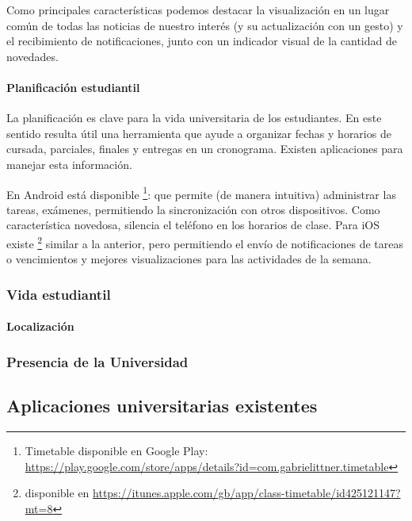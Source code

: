 Como principales características podemos destacar la visualización en un lugar común de todas las noticias de nuestro interés (y su actualización con un gesto) y el recibimiento de notificaciones, junto con un indicador visual de la cantidad de novedades.

\paragraph{Planificación estudiantil}

La planificación es clave para la vida universitaria de los estudiantes. En este sentido resulta útil una herramienta que ayude a organizar fechas y horarios
de cursada, parciales, finales y entregas en un cronograma. Existen 
aplicaciones para manejar esta información.

En Android está disponible 
\footnote{Timetable disponible en Google Play: 
\url{https://play.google.com/store/apps/details?id=com.gabrielittner.timetable} }:
que permite (de manera intuitiva) administrar las tareas, exámenes, permitiendo la sincronización con otros dispositivos. Como característica novedosa, silencia el teléfono en los horarios
de clase.
Para iOS existe 
\footnote{ disponible en
\url{https://itunes.apple.com/gb/app/class-timetable/id425121147?mt=8} } similar
a la anterior, pero permitiendo el envío de notificaciones de tareas o
vencimientos y mejores visualizaciones para las actividades de la semana.

\subsubsection{Vida estudiantil}
\label{aplicaciones_utiles_existentes_vida}

\paragraph{Localización}
\label{aplicaciones_utiles_existentes_localizacion}

\subsubsection{Presencia de la Universidad}
\label{aplicaciones_utiles_existentes_presencia}

\subsection{Aplicaciones universitarias existentes}
\label{aplicaciones_universitarias_existentes}

